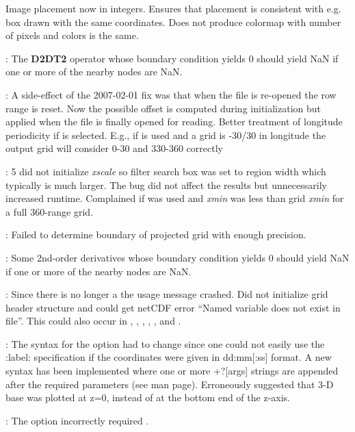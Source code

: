 \begin{description}
		Image placement now in integers. Ensures that placement is consistent with e.g. box drawn with the same coordinates.
		Does not produce colormap with number of pixels and colors is the same.
	\item [\GMTprog{gmtmath.c}]: The {\bf D2DT2} operator whose boundary condition yields 0 should yield NaN
		if one or more of the nearby nodes are NaN.
	\item [\GMTprog{grdblend.c}]: A side-effect of the 2007-02-01 fix was that when the file
		is re-opened the row range is reset.  Now the possible
		offset is computed during initialization but applied when
		the file is finally opened for reading.
		Better treatment of longitude periodicity if  is selected.
		E.g., if  is used and a grid is -30/30 in longitude the
		output grid will consider 0-30 and 330-360 correctly
	\item [\GMTprog{grdfilter.c}]: 5 did not initialize {\it xscale} so filter search box was
		set to region width which typically is much larger.  The bug
		did not affect the results but unnecessarily increased runtime.
		Complained if  was used and {\it xmin} was less than grid {\it xmin} for a full 360-range grid.
	\item [\GMTprog{grdimage.c}]: Failed to determine boundary of projected grid with enough precision.
	\item [\GMTprog{grdmath.c}]: Some 2nd-order derivatives whose boundary condition yields 0 should yield NaN
		if one or more of the nearby nodes are NaN.
	\item [\GMTprog{grdreformat.c}]: Since there is no longer a  the usage message crashed.
		Did not initialize grid header structure and could get netCDF error ``Named variable does not exist in file''.  This
		could also occur in , , , ,
		, and .
	\item [\GMTprog{psbasemap.c}]: The syntax for the  option had to change since one could
		not easily use the :label: specification if the coordinates
		were given in dd:mm[:ss] format.  A new syntax has been
		implemented where one or more +?[args] strings are appended
		after the required parameters (see man page).
		Erroneously suggested that 3-D base was plotted at z=0, instead of at the bottom end of the z-axis.
	\item [\GMTprog{pscoast.c}]: The  option incorrectly required .

\end{description}

